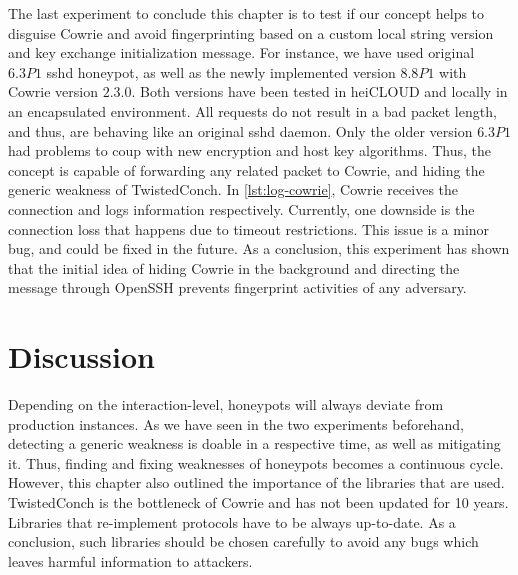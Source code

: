 The last experiment to conclude this chapter is to test if our concept helps to disguise Cowrie and avoid fingerprinting based on a custom local string version and key exchange initialization message.
For instance, we have used \citet{vetterl2020} original $6.3P1$ sshd honeypot, as well as the newly implemented version $8.8P1$ with Cowrie version $2.3.0$.
Both versions have been tested in heiCLOUD and locally in an encapsulated environment.
All requests do not result in a bad packet length, and thus, are behaving like an original sshd daemon.
Only the older version $6.3P1$ had problems to coup with new encryption and host key algorithms.
Thus, the concept is capable of forwarding any related packet to Cowrie, and hiding the generic weakness of TwistedConch.
In \autoref{lst:log-cowrie}, Cowrie receives the connection and logs information respectively.
Currently, one downside is the connection loss that happens due to timeout restrictions.
This issue is a minor bug, and could be fixed in the future.
As a conclusion, this experiment has shown that the initial idea of hiding Cowrie in the background and directing the message through OpenSSH prevents fingerprint activities of any adversary.

\begin{figure}
    
\end{figure}

\section{Discussion}

Depending on the interaction-level, honeypots will always deviate from production instances.
As we have seen in the two experiments beforehand, detecting a generic weakness is doable in a respective time, as well as mitigating it.
Thus, finding and fixing weaknesses of honeypots becomes a continuous cycle.
However, this chapter also outlined the importance of the libraries that are used.
TwistedConch is the bottleneck of Cowrie and has not been updated for 10 years.
Libraries that re-implement protocols have to be always up-to-date.
As a conclusion, such libraries should be chosen carefully to avoid any bugs which leaves harmful information to attackers.

